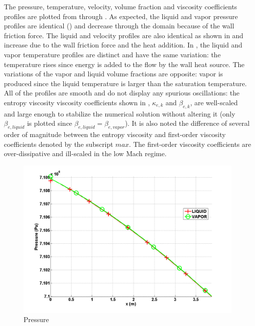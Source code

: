 The pressure, temperature, velocity, volume fraction and viscosity coefficients profiles are plotted from  through . As expected, the liquid and vapor pressure profiles are identical () and decrease through the domain because of the wall friction force. The liquid and velocity profiles are also identical as shown in  and increase due to the wall friction force and the heat addition. In , the liquid and vapor temperature profiles are distinct and have  the same variation: the temperature rises since energy is added to the flow by the wall heat source. The variations of the vapor and liquid volume fractions are opposite: vapor is produced since the liquid temperature is larger than the saturation temperature. All of the profiles are smooth and do not display any spurious oscillations: the entropy viscosity viscosity coefficients shown in , $\kappa_{e,k}$ and $\beta_{e,k}$, are well-scaled and large enough to stabilize the numerical solution without altering it (only $\beta_{e,liquid}$ is plotted since $\beta_{e,liquid}=\beta_{e,vapor}$). It is also noted the difference of several order of magnitude between the entropy viscosity and first-order viscosity coefficients denoted by the subscript $max$. The first-order viscosity coefficients are over-dissipative and ill-scaled in the low Mach regime.
%
        \begin{figure}[H]
                \centering
                \includegraphics[width=\textwidth]{figures/SEM/ANS_WINTER_2014_7Eqn_pressure.png}
                \caption{Pressure}
                \label{fig:pressure}
        \end{figure}%
